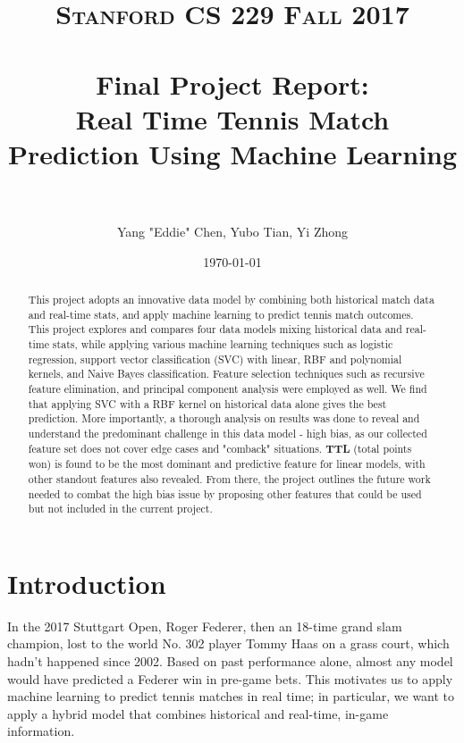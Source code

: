 \documentclass[paper=a4, fontsize=10pt]{scrartcl} %
\title{	
\normalfont \normalsize 
\textsc{Stanford CS 229 Fall 2017} \\ [20pt] %
\horrule{0.5pt} \\[0.4cm] %
\Large Final Project Report: \\
\Large Real Time Tennis Match Prediction Using Machine Learning\\ %
\horrule{2pt} \\[0.5cm] %
}
\author{Yang "Eddie" Chen, Yubo Tian, Yi Zhong} %
\date{\normalsize\today} %
\numberwithin{equation}{section} %
\numberwithin{figure}{section} %
\numberwithin{table}{section} %
\begin{document}
\twocolumn[
\maketitle %
]
\begin{abstract}
This project adopts an innovative data model by combining both historical match data and real-time stats, and apply machine learning to predict tennis match outcomes. This project explores and compares four data models mixing historical data and real-time stats, while applying various machine learning techniques such as logistic regression, support vector classification (SVC) with linear, RBF and polynomial kernels, and Naive Bayes classification. Feature selection techniques such as recursive feature elimination, and principal component analysis were employed as well. We find that applying SVC with a RBF kernel on historical data alone gives the best prediction. More importantly, a thorough analysis on results was done to reveal and understand the predominant challenge in this data model - high bias, as our collected feature set does not cover edge cases and "comback" situations. \textbf{TTL} (total points won) is found to be the most dominant and predictive feature for linear models, with other standout features also revealed. From there, the project outlines the future work needed to combat the high bias issue by proposing other features that could be used but not included in the current project. 
\end{abstract}

\section{Introduction}
In the 2017 Stuttgart Open, Roger Federer, then an 18-time grand slam champion, lost to the world No. 302 player Tommy Haas on a grass court, which hadn't happened since 2002.  Based on past performance alone, almost any model would have predicted a Federer win in pre-game bets. This motivates us to apply machine learning to predict tennis matches in real time; in particular, we want to apply a hybrid model that combines historical and real-time, in-game information.
\end{document}

